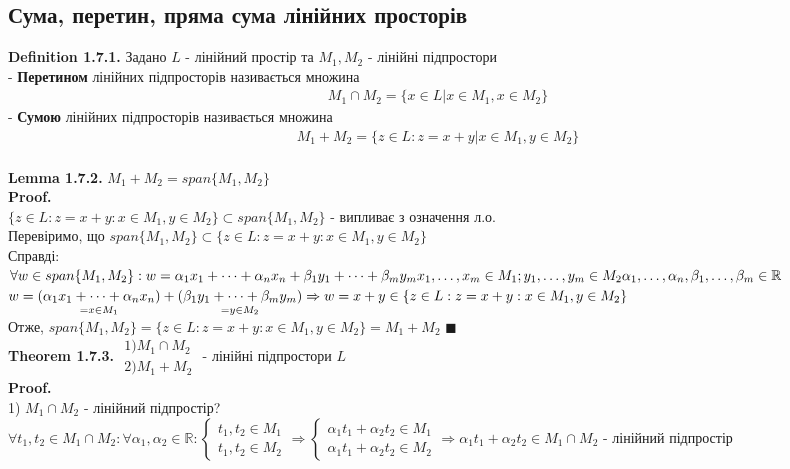 \documentclass[a4paper, 14pt]{extarticle}
\def\defin#1{\textbf{Definition {#1}}}
\def\lm#1{\textbf{Lemma {#1}}}
\def\th#1{\textbf{Theorem {#1}}}
\def\proof{\textbf{Proof.}\\}
\def\bigline{\vspace{5mm}\\}
\def\qed{$\blacksquare$}
\begin{document}
	\subsection{Сума, перетин, пряма сума лінійних просторів}
	\defin{1.7.1.} Задано $L$ - лінійний простір та $M_1, M_2$ - лінійні підпростори\\
	- \textbf{Перетином} лінійних підпросторів називається множина
	\begin{align*}
	M_1 \cap M_2 = \{x \in L | x \in M_1, x \in M_2 \}
	\end{align*}
	- \textbf{Сумою} лінійних підпросторів називається множина
	\begin{align*}
	M_1 + M_2 = \{z \in L: z = x + y | x \in M_1, y \in M_2\}
	\end{align*}
	\\
	\lm{1.7.2.} $M_1 + M_2 = span\{M_1, M_2\}$\\
	\proof
	$\{z \in L: z = x+y: x \in M_1, y \in M_2\} \subset span\{M_1, M_2\}$ - випливає з означення л.о.\\
	Перевіримо, що $span\{M_1, M_2\} \subset \{z \in L: z = x+y: x \in M_1, y \in M_2\}$\\
	Справді:\\
	$\forall w \in span\{M_1, M_2\}: w = \alpha_1 x_1 + \dots + \alpha_n x_n + \beta_1 y_1 + \dots + \beta_m y_m \\ x_1, \dots, x_m \in M_1; y_1, \dots, y_m \in M_2 \\ \alpha_1, \dots, \alpha_n, \beta_1, \dots, \beta_m \in \mathbb{R}$\\
	$w = \underset{= x \in M_1}{(\alpha_1 x_1 + \dots + \alpha_n x_n )}+ \underset{= y \in M_2}{(\beta_1 y_1 + \dots + \beta_m y_m)} \Rightarrow \\ w = x + y \in \{z \in L: z = x+y: x \in M_1, y \in M_2\}$\\
	Отже, $span\{M_1, M_2\} = \{z \in L: z = x+y: x \in M_1, y \in M_2\} = M_1 + M_2$ \qed
	\bigline
	\th{1.7.3.} $\begin{gathered} 1) M_1 \cap M_2 \\ 2) M_1 + M_2 \end{gathered}$ - лінійні підпростори $L$\\
	\proof
	1) $M_1 \cap M_2$ - лінійний підпростір?\\
	$\forall t_1, t_2 \in M_1 \cap M_2: \forall \alpha_1, \alpha_2 \in \mathbb{R}: \begin{cases} t_1, t_2 \in M_1 \\ t_1, t_2 \in M_2 \end{cases} \Rightarrow \begin{cases} \alpha_1 t_1 + \alpha_2 t_2 \in M_1 \\ \alpha_1 t_1 + \alpha_2 t_2 \in M_2 \end{cases} \Rightarrow \alpha_1 t_1 + \alpha_2 t_2 \in M_1 \cap M_2$ - лінійний підпростір
\end{document}
